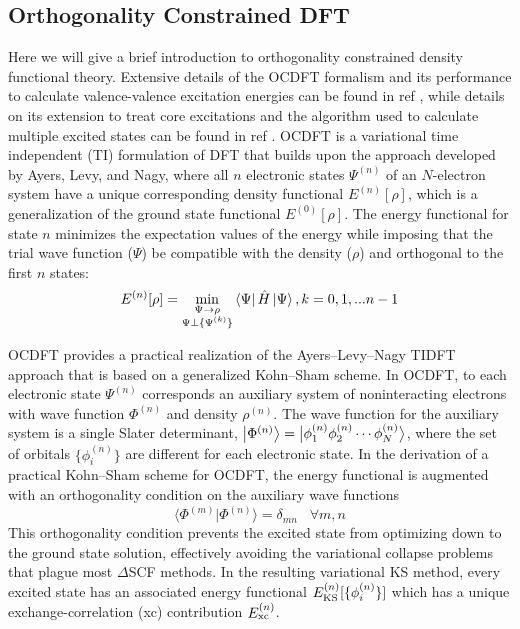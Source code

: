 \documentclass{article}
\begin{document}
\subsection{Orthogonality Constrained DFT}
Here we will give a brief introduction to orthogonality constrained density functional theory. Extensive details of the OCDFT formalism and its performance to calculate valence-valence excitation energies can be found in ref , while details on its extension to treat core excitations and the algorithm used to calculate multiple excited states can be found in ref .  OCDFT is a variational time independent (TI) formulation of DFT that builds upon the approach developed by Ayers, Levy, and Nagy\cite{ayers_time-independent_2012}, where all $n$ electronic states $\Psi^{(n)}$ of an $N$-electron system have a unique corresponding density functional $E^{(n)}[\rho]$, which is a generalization of the ground state functional $E^{(0)}[\rho]$. The energy functional for state $n$ minimizes the expectation values of the energy while imposing that the trial wave function ($\Psi$) be compatible with the density ($\rho$) and  orthogonal to the first $n$ states: 
\begin{equation}
E^{(n)}[\rho] = \min_{
\substack{
\Psi \rightarrow \rho\\
\Psi\bot \{\Psi^{(k)}\}
}
}
\bra{\Psi}\hat{H}\ket{\Psi}, k = 0,1,...n-1
\end{equation}

OCDFT provides a practical realization of the Ayers--Levy--Nagy TIDFT approach that is based on a generalized Kohn--Sham scheme.
In OCDFT, to each electronic state $\Psi^{(n)}$ corresponds an auxiliary system of noninteracting electrons with wave function $\Phi^{(n)}$ and density $\rho^{(n)}$. 
The wave function for the auxiliary system is a single Slater determinant, $\ket{\Phi^{(n)}} = \ket[1]{\phi_1^{(n)}\phi_2^{(n)} \cdots\phi_N^{(n)}}$, where the set of orbitals $\{\phi_i^{(n)}\}$ are different for each electronic state.
In the derivation of a practical Kohn--Sham scheme for OCDFT, the energy functional is augmented with an orthogonality condition on the auxiliary wave functions
\begin{equation}
\label{eq:OCcondition}
\langle \Phi^{(m)} | \Phi^{(n)} \rangle = \delta_{mn} \;\;\;  \forall m,n
\end{equation}
This orthogonality condition prevents the excited state from optimizing down to the ground state solution, effectively avoiding the variational collapse problems that plague most $\Delta$SCF methods.
In the resulting variational KS method, every excited state has an associated energy functional $E^{(n)}_{\rm KS}[\{\phi^{(n)}_i\}]$ which has a unique exchange-correlation (xc) contribution $E^{(n)}_{\rm xc}$.
\end{document}
